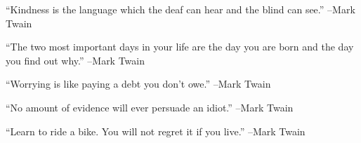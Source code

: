 \documentclass{article}%
\begin{document}
\linebreak%
\vspace{1mm}%
\begin{minipage}{\textwidth}%
\flushleft%
“Kindness is the language which the deaf can hear and the blind can see.”%
\linebreak%
\vspace{1mm}%
–Mark Twain%
\linebreak%
\vspace{1mm}%
\end{minipage}%
\linebreak%
\vspace{1mm}%
\begin{minipage}{\textwidth}%
\flushleft%
“The two most important days in your life are the day you are born and the day you find out why.”%
\linebreak%
\vspace{1mm}%
–Mark Twain%
\linebreak%
\vspace{1mm}%
\end{minipage}%
\linebreak%
\vspace{1mm}%
\begin{minipage}{\textwidth}%
\flushleft%
“Worrying is like paying a debt you don't owe.”%
\linebreak%
\vspace{1mm}%
–Mark Twain%
\linebreak%
\vspace{1mm}%
\end{minipage}%
\linebreak%
\vspace{1mm}%
\begin{minipage}{\textwidth}%
\flushleft%
“No amount of evidence will ever persuade an idiot.”%
\linebreak%
\vspace{1mm}%
–Mark Twain%
\linebreak%
\vspace{1mm}%
\end{minipage}%
\linebreak%
\vspace{1mm}%
\begin{minipage}{\textwidth}%
\flushleft%
“Learn to ride a bike. You will not regret it if you live.”%
\linebreak%
\vspace{1mm}%
–Mark Twain%
\linebreak%
\vspace{1mm}%
\end{minipage}%
\end{document}
